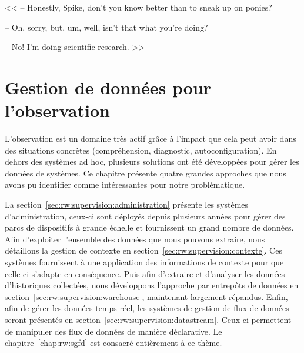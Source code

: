 \begin{savequote}[6cm]
<< -- Honestly, Spike, don't you know better than to sneak up on ponies?

-- Oh, sorry, but, um, well, isn't that what you're doing?

-- No! I'm doing scientific research. >>
\end{savequote}

\chapter{Gestion de données pour l'observation}\label{chap:rw:supervision}
\chaptertoc

L'observation est un domaine très actif grâce à l'impact que cela peut avoir dans des situations concrètes (compréhension, diagnostic, autoconfiguration). En dehors des systèmes ad hoc, plusieurs solutions ont été développées pour gérer les données de systèmes. Ce chapitre présente quatre grandes approches que nous avons pu identifier comme intéressantes pour notre problématique.

La section~\ref{sec:rw:supervision:administration} présente les systèmes d'administration, ceux-ci sont déployés depuis plusieurs années pour gérer des parcs de dispositifs à grande échelle et fournissent un grand nombre de données. Afin d'exploiter l'ensemble des données que nous pouvons extraire, nous détaillons la gestion de contexte en section~\ref{sec:rw:supervision:contexte}. Ces systèmes fournissent à une application des informations de contexte pour que celle-ci s'adapte en conséquence.  Puis afin d'extraire et d'analyser les données d'historiques collectées, nous développons l'approche par entrepôts de données en section~\ref{sec:rw:supervision:warehouse}, maintenant largement répandus. Enfin, afin de gérer les données temps réel, les systèmes de gestion de flux de données seront présentés en section~\ref{sec:rw:supervision:datastream}. Ceux-ci permettent de manipuler des flux de données de manière déclarative. Le chapitre~\ref{chap:rw:sgfd} est consacré entièrement à ce thème.






